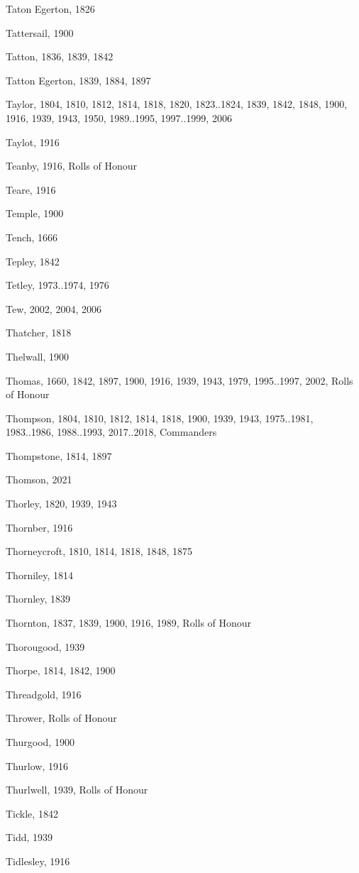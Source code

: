 {\begin{theindex}
\item Taton Egerton, 1826
\item Tattersail, 1900
\item Tatton, 1836, 1839, 1842
\item Tatton Egerton, 1839, 1884, 1897
\item Taylor, 1804, 1810, 1812, 1814, 1818, 1820, 1823..1824, 1839, 1842, 1848, 1900, 1916, 1939, 1943, 1950, 1989..1995, 1997..1999, 2006
\item Taylot, 1916
\item Teanby, 1916, Rolls of Honour
\item Teare, 1916
\item Temple, 1900
\item Tench, 1666
\item Tepley, 1842
\item Tetley, 1973..1974, 1976
\item Tew, 2002, 2004, 2006
\item Thatcher, 1818
\item Thelwall, 1900
\item Thomas, 1660, 1842, 1897, 1900, 1916, 1939, 1943, 1979, 1995..1997, 2002, Rolls of Honour
\item Thompson, 1804, 1810, 1812, 1814, 1818, 1900, 1939, 1943, 1975..1981, 1983..1986, 1988..1993, 2017..2018, Commanders
\item Thompstone, 1814, 1897
\item Thomson, 2021
\item Thorley, 1820, 1939, 1943
\item Thornber, 1916
\item Thorneycroft, 1810, 1814, 1818, 1848, 1875
\item Thorniley, 1814
\item Thornley, 1839
\item Thornton, 1837, 1839, 1900, 1916, 1989, Rolls of Honour
\item Thorougood, 1939
\item Thorpe, 1814, 1842, 1900
\item Threadgold, 1916
\item Thrower, Rolls of Honour
\item Thurgood, 1900
\item Thurlow, 1916
\item Thurlwell, 1939, Rolls of Honour
\item Tickle, 1842
\item Tidd, 1939
\item Tidlesley, 1916

\end{theindex}}
